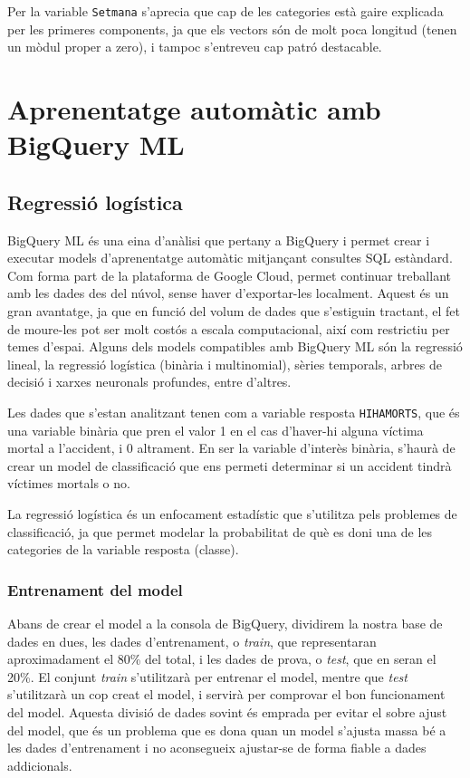 \documentclass[12pt,longbibliography]{article}
\theoremstyle{definition}
\theoremstyle{remark}
\begin{document}
Per la variable \texttt{Setmana} s'aprecia que cap de les categories està gaire explicada per les primeres components, ja que els vectors són de molt poca longitud (tenen un mòdul proper a zero), i tampoc s'entreveu cap patró destacable.

\newpage

\section{Aprenentatge automàtic amb BigQuery ML}

\subsection{Regressió logística}

BigQuery ML és una eina d'anàlisi que pertany a BigQuery i permet crear i executar models d'aprenentatge automàtic mitjançant consultes SQL estàndard. Com forma part de la plataforma de Google Cloud, permet continuar treballant amb les dades des del núvol, sense haver d'exportar-les localment. Aquest és un gran avantatge, ja que en funció del volum de dades que s'estiguin tractant, el fet de moure-les pot ser molt costós a escala computacional, així com restrictiu per temes d'espai. Alguns dels models compatibles amb BigQuery ML són la regressió lineal, la regressió logística (binària i multinomial), sèries temporals, arbres de decisió i xarxes neuronals profundes, entre d'altres.


Les dades que s'estan analitzant tenen com a variable resposta \texttt{HIHAMORTS}, que és una variable binària que pren el valor 1 en el cas d'haver-hi alguna víctima mortal a l'accident, i 0 altrament. En ser la variable d'interès binària, s'haurà de crear un model de classificació que ens permeti determinar si un accident tindrà víctimes mortals o no. 


La regressió logística és un enfocament estadístic que s'utilitza pels problemes de classificació, ja que permet modelar la probabilitat de què es doni una de les categories de la variable resposta (classe).


\subsubsection{Entrenament del model}

Abans de crear el model a la consola de BigQuery, dividirem la nostra base de dades en dues, les dades d'entrenament, o \emph{train}, que representaran aproximadament el 80\% del total, i les dades de prova, o \emph{test}, que en seran el 20\%. El conjunt \emph{train} s'utilitzarà per entrenar el model, mentre que \emph{test} s'utilitzarà un cop creat el model, i servirà per comprovar el bon funcionament del model. Aquesta divisió de dades sovint és emprada per evitar el sobre ajust del model, que és un problema que es dona quan un model s'ajusta massa bé a les dades d'entrenament i no aconsegueix ajustar-se de forma fiable a dades addicionals.
\end{document}
